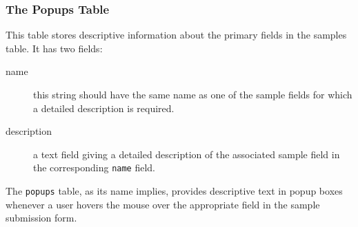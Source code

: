 \documentclass[12pt]{article}
\begin{document}
\subsubsection{The Popups Table}
This table stores descriptive information about the primary fields
in the samples table. It has two fields:

\begin{description}
\item[name]
this string should have the same name as one of the sample fields for
which a detailed description is required.
\item[description]
a text field giving a detailed description of the associated sample field
in the corresponding \verb=name= field.
\end{description}

The \verb=popups= table, as its name implies, provides descriptive
text in popup boxes whenever a user hovers the mouse over the
appropriate field in the sample submission form.
\end{document}
